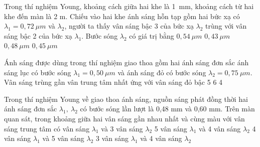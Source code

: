 \begin{vidu}%
Trong thí nghiệm Young, khoảng cách giữa hai khe là 1\ mm, khoảng cách từ hai khe đến màn là 2 m. Chiếu vào hai khe ánh sáng hỗn tạp gồm hai bức xạ có $\lambda_1=0,72\ \mu m$ và $\lambda_2$, người ta thấy vân sáng bậc 3 của bức xạ $\lambda_2$ trùng với vân sáng bậc 2 của bức xạ $\lambda_1$. Bước sóng  $\lambda_2$ có giá trị bằng
\choice
{$0,54\ \mu m$}
{$0,43\ \mu m$}
{\True $0,48\ \mu m$}
{$0,45\ \mu m$}
\end{vidu} %
\begin{vidu}%
Ánh sáng được dùng trong thí nghiệm giao thoa gồm hai ánh sáng đơn sắc ánh sáng lục có bước sóng $\lambda_1=0,50\ \mu m $ và ánh sáng đỏ có bước sóng $\lambda_2=0,75\ \mu m $. Vân sáng trùng gần vân trung tâm nhất ứng với vân sáng đỏ bậc
\choice
{5}
{6}
{4}
{}
\end{vidu} %
\begin{vidu}%
Trong thí nghiệm Young về giao thoa ánh sáng, nguồn sáng phát đồng thời hai ánh sáng đơn sắc $\lambda_1,\ \lambda_2 $ có bước sóng lần lượt là 0,48 mm và 0,60 mm. Trên màn quan sát, trong khoảng giữa hai vân sáng gần nhau nhất và cùng màu với vân sáng trung tâm có
\choice
{ vân sáng $\lambda_1 $ và 3 vân sáng $\lambda_2 $}
{5 vân sáng $\lambda_1 $ và 4 vân sáng $\lambda_2 $}
{4 vân sáng $\lambda_1 $ và 5 vân sáng $\lambda_2 $}
{3 vân sáng $\lambda_1 $ và 4 vân sáng $\lambda_2 $}
\end{vidu} %
